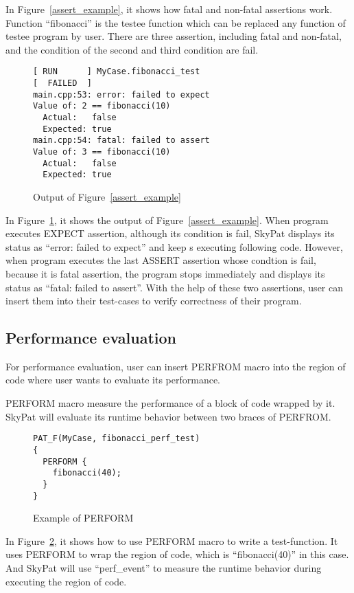 \documentclass[final]{ols}
\begin{document}
In Figure~\ref{assert_example}, it shows how fatal and non-fatal assertions work.
Function ``fibonacci'' is the testee function which can be replaced any function of testee program by user.
There are three assertion, including fatal and non-fatal, and the condition of the second and third condition are fail.

\begin{figure}[h]
\lstset{language=sh}
\begin{lstlisting}[frame=single]
[ RUN      ] MyCase.fibonacci_test
[  FAILED  ] 
main.cpp:53: error: failed to expect
Value of: 2 == fibonacci(10)
  Actual:   false
  Expected: true
main.cpp:54: fatal: failed to assert
Value of: 3 == fibonacci(10)
  Actual:   false
  Expected: true
\end{lstlisting}
\caption{Output of Figure~\ref{assert_example}}
\label{assert_example_output}
\end{figure}

In Figure~\ref{assert_example_output}, it shows the output of Figure~\ref{assert_example}.
When program executes EXPECT assertion, although its condition is fail, SkyPat displays its status as ``error: failed to expect'' and keep s executing following code.
However, when program executes the last ASSERT assertion whose condtion is fail, because it is fatal assertion, the program stops immediately and displays its status as ``fatal: failed to assert''.
With the help of these two assertions, user can insert them into their test-cases to verify correctness of their program.

\subsection{Performance evaluation}
For performance evaluation, user can insert PERFROM macro into the region of code where user wants to evaluate its performance.

PERFORM macro measure the performance of a block of code wrapped by it.
SkyPat will evaluate its runtime behavior between two braces of PERFROM.

\begin{figure}[h]
\lstset{language=C++}
\begin{lstlisting}[frame=single]
PAT_F(MyCase, fibonacci_perf_test)
{
  PERFORM {
    fibonacci(40);
  }
}
\end{lstlisting}
\caption{Example of PERFORM}
\label{perform_example}
\end{figure}

In Figure~\ref{perform_example}, it shows how to use PERFORM macro to write a test-function.
It uses PERFORM to wrap the region of code, which is ``fibonacci(40)'' in this case. 
And SkyPat will use ``perf\_event'' to measure the runtime behavior during executing the region of code.
\end{document}
